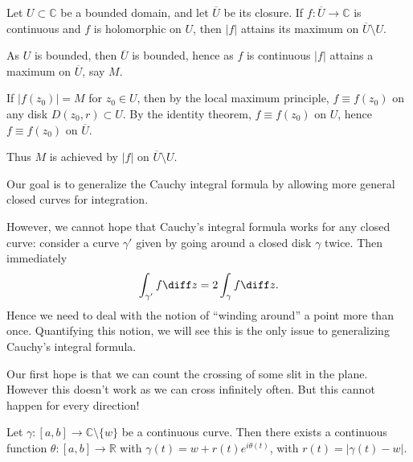 \documentclass[12pt]{article}
\begin{document}
\begin{corollary}
	Let $U \subset \mathbb{C}$ be a bounded domain, and let $\overline{U}$ be its closure. If $f : \overline{U} \to \mathbb{C}$ is continuous and $f$ is holomorphic on $U$, then $|f|$ attains its maximum on $\overline{U} \setminus U$.
\end{corollary}

\begin{proofbox}
	As $U$ is bounded, then $\overline{U}$ is bounded, hence as $f$ is continuous $|f|$ attains a maximum on $\overline{U}$, say $M$.

	If $|f(z_0)| = M$ for $z_0 \in U$, then by the local maximum principle, $f \equiv f(z_0)$ on any disk $D(z_0, r) \subset U$. By the identity theorem, $f \equiv f(z_0)$ on $U$, hence $f \equiv f(z_0)$ on $\overline{U}$.

	Thus $M$ is achieved by $|f|$ on $\overline{U} \setminus U$.
\end{proofbox}

Our goal is to generalize the Cauchy integral formula by allowing more general closed curves for integration.

However, we cannot hope that Cauchy's integral formula works for any closed curve: consider a curve $\gamma'$ given by going around a closed disk $\gamma$ twice. Then immediately
\[
\int_{\gamma'}f \diff z = 2 \int_{\gamma}f \diff z
.\]
Hence we need to deal with the notion of ``winding around'' a point more than once. Quantifying this notion, we will see this is the only issue to generalizing Cauchy's integral formula.

Our first hope is that we can count the crossing of some slit in the plane. However this doesn't work as we can cross infinitely often. But this cannot happen for every direction!

\begin{theorem}
	Let $\gamma : [a, b] \to \mathbb{C} \setminus \{w\}$ be a continuous curve. Then there exists a continuous function $\theta : [a, b] \to \mathbb{R}$ with $\gamma(t) = w + r(t) e^{i \theta (t)}$, with $r(t) = |\gamma(t) - w|$.
\end{theorem}
\end{document}
